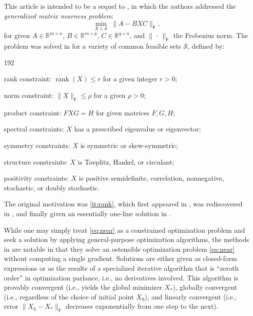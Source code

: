 \documentclass[11pt,reqno]{amsart}
\newcommand{\F}{{\scriptscriptstyle\mathsf{F}}}
\DeclareMathOperator{\rank}{rank}
\theoremstyle{definition}
\numberwithin{equation}{section}
\newcommand{\R}{\mathbb{R}}
\begin{document}
This article is intended to be a sequel to \cite{li22}, in which the authors addressed the \emph{generalized matrix nearness problem}:
\begin{equation}\label{eq:near}
    \min_{X \in \mathcal{S}} \; \lVert A- BXC\rVert_\F ,
\end{equation}
for given $A \in \R^{m \times n}$, $B \in \R^{m \times p}$, $C \in \R^{q \times n}$, and $\lVert \, \cdot \, \rVert_\F $ the Frobenius norm. The problem was solved in \cite{li22} for a variety of common feasible sets $\mathcal{S}$, defined by:
\begin{dingautolist}{192}
    \item rank constraint: $\rank(X) \le r$ for a given integer $r>0$; \label{it:rank}
    \item norm constraint: $\lVert X \rVert_\F \le \rho$ for a given $\rho > 0$; \label{it:norm}
    \item product constraint: $FXG=H$ for given matrices $F,G,H$; \label{it:prod}
    \item spectral constraints: $X$ has a prescribed eigenvalue or eigenvector; \label{it:eig}
    \item symmetry constraints: $X$ is symmetric or skew-symmetric; \label{it:sym}
    \item structure constraints: $X$ is Toeplitz, Hankel, or circulant; \label{it:spec}
    \item positivity constraints: $X$ is positive semidefinite, correlation, nonnegative, stochastic, or doubly stochastic. \label{it:pos}
\end{dingautolist}
The original motivation was \ref{it:rank}, which first appeared in \cite{Sondermann}, was rediscovered in \cite{Fri}, and finally given an essentially one-line solution in \cite{li22}.

While one may simply treat \eqref{eq:near} as a constrained optimization problem and seek a solution by applying general-purpose optimization algorithms, the methods in \cite{li22} are notable in that they solve an ostensible optimization problem \eqref{eq:near} without computing a single gradient. Solutions are either given as closed-form expressions or as the results of a specialized iterative algorithm that is ``zeroth order'' in optimization parlance, i.e., no derivatives involved. This algorithm \cite[Algorithm~5]{li22} is provably convergent (i.e., yields the global minimizer  $X_*$), globally convergent (i.e., regardless of the choice of initial point $X_0$), and linearly convergent (i.e., error $\lVert X_k - X_* \rVert_\F$ decreases exponentially from one step to the next).
\end{document}
